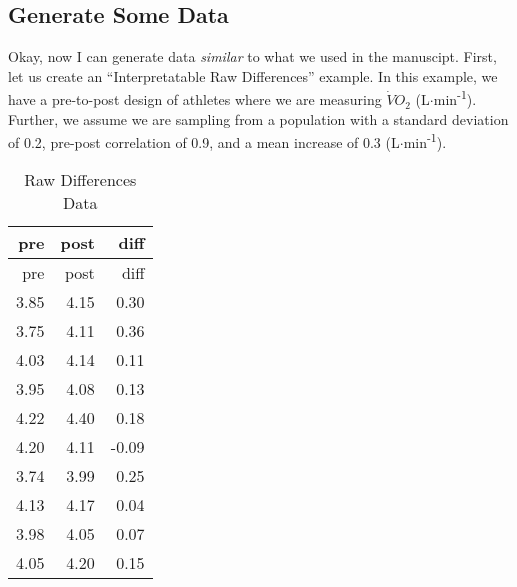 \documentclass[]{tufte-handout}
\newenvironment{Shaded}{}{}
\newcommand{\CommentTok}[1]{\textcolor[rgb]{0.38,0.63,0.69}{\textit{#1}}}
\newcommand{\DataTypeTok}[1]{\textcolor[rgb]{0.56,0.13,0.00}{#1}}
\newcommand{\DecValTok}[1]{\textcolor[rgb]{0.25,0.63,0.44}{#1}}
\newcommand{\FloatTok}[1]{\textcolor[rgb]{0.25,0.63,0.44}{#1}}
\newcommand{\KeywordTok}[1]{\textcolor[rgb]{0.00,0.44,0.13}{\textbf{#1}}}
\newcommand{\NormalTok}[1]{#1}
\newcommand{\OperatorTok}[1]{\textcolor[rgb]{0.40,0.40,0.40}{#1}}
\newcommand{\StringTok}[1]{\textcolor[rgb]{0.25,0.44,0.63}{#1}}
\begin{document}
\hypertarget{generate-some-data}{%
\subsection{Generate Some Data}\label{generate-some-data}}

Okay, now I can generate data \emph{similar} to what we used in the
manuscipt. First, let us create an ``Interpretatable Raw Differences''
example. In this example, we have a pre-to-post design of athletes where
we are measuring \(\dot{V}O_2\) (L\(\cdot\)min\textsuperscript{-1}).
Further, we assume we are sampling from a population with a standard
deviation of 0.2, pre-post correlation of 0.9, and a mean increase of
0.3 (L\(\cdot\)min\textsuperscript{-1}).

\begin{Shaded}
\end{Shaded}

\begin{longtable}[]{@{}rrr@{}}
\caption{Raw Differences Data}\tabularnewline
\toprule
pre & post & diff\tabularnewline
\midrule
\endfirsthead
\toprule
pre & post & diff\tabularnewline
\midrule
\endhead
3.85 & 4.15 & 0.30\tabularnewline
3.75 & 4.11 & 0.36\tabularnewline
4.03 & 4.14 & 0.11\tabularnewline
3.95 & 4.08 & 0.13\tabularnewline
4.22 & 4.40 & 0.18\tabularnewline
4.20 & 4.11 & -0.09\tabularnewline
3.74 & 3.99 & 0.25\tabularnewline
4.13 & 4.17 & 0.04\tabularnewline
3.98 & 4.05 & 0.07\tabularnewline
4.05 & 4.20 & 0.15\tabularnewline
\bottomrule
\end{longtable}
\end{document}
